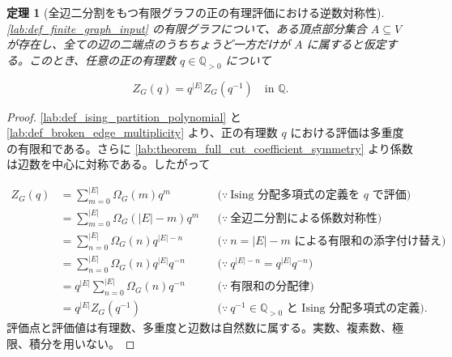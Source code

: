 \documentclass[11pt,a4paper]{article}
\newtheorem{theorem}[definition]{定理}
\theoremstyle{remark}
\begin{document}
\begin{theorem}[全辺二分割をもつ有限グラフの正の有理評価における逆数対称性]\label{lab:theorem_full_cut_positive_rational_evaluation_reciprocity}
\cref{lab:def_finite_graph_input}
 の有限グラフについて、ある頂点部分集合 
$A\subseteq V$
 が存在し、全ての辺の二端点のうちちょうど一方だけが 
$A$
 に属すると仮定する。このとき、任意の正の有理数 
$q\in\mathbb Q_{>0}$
 について

\[Z_G(q)=q^{|E|}Z_G(q^{-1})\quad\text{in }\mathbb Q.\]
\end{theorem}
\begin{proof}
\cref{lab:def_ising_partition_polynomial}
 と 
\cref{lab:def_broken_edge_multiplicity}
 より、正の有理数 
$q$
 における評価は多重度の有限和である。さらに 
\cref{lab:theorem_full_cut_coefficient_symmetry}
 より係数は辺数を中心に対称である。したがって

\[\begin{aligned}
Z_G(q)
&=\sum_{m=0}^{|E|}\Omega_G(m)q^m
&&\bigl(\because\ \text{Ising 分配多項式の定義を }q\text{ で評価}\bigr)\\
&=\sum_{m=0}^{|E|}\Omega_G(|E|-m)q^m
&&\bigl(\because\ \text{全辺二分割による係数対称性}\bigr)\\
&=\sum_{n=0}^{|E|}\Omega_G(n)q^{|E|-n}
&&\bigl(\because\ n=|E|-m\text{ による有限和の添字付け替え}\bigr)\\
&=\sum_{n=0}^{|E|}\Omega_G(n)q^{|E|}q^{-n}
&&\bigl(\because\ q^{|E|-n}=q^{|E|}q^{-n}\bigr)\\
&=q^{|E|}\sum_{n=0}^{|E|}\Omega_G(n)q^{-n}
&&\bigl(\because\ \text{有限和の分配律}\bigr)\\
&=q^{|E|}Z_G(q^{-1})
&&\bigl(\because\ q^{-1}\in\mathbb Q_{>0}\text{ と Ising 分配多項式の定義}\bigr).
\end{aligned}\]
評価点と評価値は有理数、多重度と辺数は自然数に属する。実数、複素数、極限、積分を用いない。

\end{proof}
\end{document}
